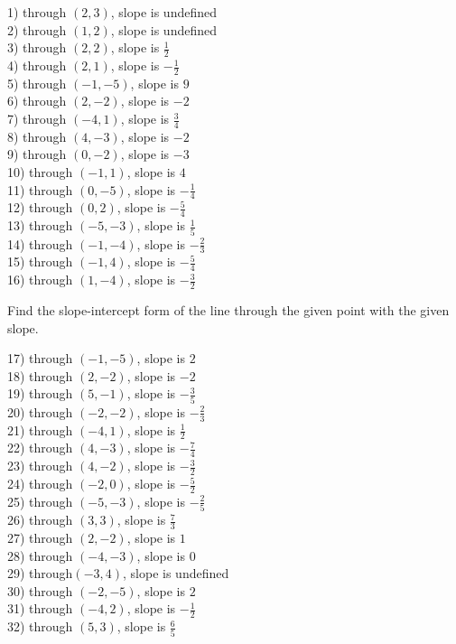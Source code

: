 \documentclass[12pt]{article}
\theoremstyle{definition}
\begin{document}
\begin{multicols}{2}
  1) through $(2, 3)$, slope is undefined\\
  2) through $(1, 2)$, slope is undefined\\
  3) through $(2, 2)$, slope is $\frac{1}{2}$\\
  4) through $(2, 1)$, slope is $- \frac{1}{2}$\\
  5) through $(- 1, - 5)$, slope is $9$\\
  6) through $(2, - 2)$, slope is $- 2$\\
  7) through $(- 4, 1)$, slope is $\frac{3}{4}$\\
  8) through $(4, - 3)$, slope is $- 2$\\
  9) through $(0, - 2)$, slope is $- 3$\\
  10) through $(- 1, 1)$, slope is $4$\\
  11) through $(0, - 5)$, slope is $- \frac{1}{4}$\\
  12) through $(0, 2)$, slope is $- \frac{5}{4}$\\
  13) through $(- 5, - 3)$, slope is $\frac{1}{5}$\\
  14) through $(- 1, - 4)$, slope is $- \frac{2}{3}$\\
  15) through $(- 1, 4)$, slope is $- \frac{5}{4}$\\
  16) through $(1, - 4)$, slope is $- \frac{3}{2}$
\end{multicols}

Find the slope-intercept form of the line through the given point with the given slope.

\begin{multicols}{2}
  17) through $(- 1, - 5)$, slope is $2$\\
  18) through $(2, - 2)$, slope is $- 2$\\
  19) through $(5, - 1)$, slope is $- \frac{3}{5}$\\
  20) through $(- 2, - 2)$, slope is $- \frac{2}{3}$\\
  21) through $(- 4, 1)$, slope is $\frac{1}{2}$\\
  22) through $(4, - 3)$, slope is $- \frac{7}{4}$\\
  23) through $(4, - 2)$, slope is $- \frac{3}{2}$\\
  24) through $(- 2, 0)$, slope is $- \frac{5}{2}$\\
  25) through $(- 5, - 3)$, slope is $- \frac{2}{5}$\\
  26) through $(3, 3)$, slope is $\frac{7}{3}$\\
  27) through $(2, - 2)$, slope is $1$\\
  28) through $(- 4, - 3)$, slope is $0$\\
  29) through$(- 3, 4)$, slope is undefined\\
  30) through $(- 2, - 5)$, slope is $2$\\
  31) through $(- 4, 2)$, slope is $- \frac{1}{2}$\\
  32) through $(5, 3)$, slope is $\frac{6}{5}$
\end{multicols}
\end{document}
